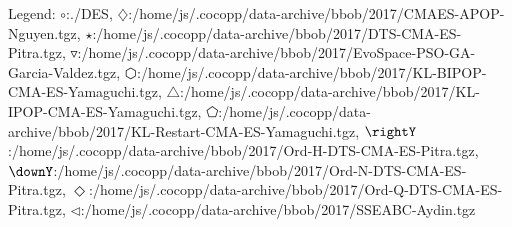 Legend: {\color{NavyBlue}$\circ$}:./DES, {\color{Magenta}$\diamondsuit$}:/home/js/.cocopp/data-archive/bbob/2017/CMAES-APOP-Nguyen.tgz, {\color{Orange}$\star$}:/home/js/.cocopp/data-archive/bbob/2017/DTS-CMA-ES-Pitra.tgz, {\color{CornflowerBlue}$\triangledown$}:/home/js/.cocopp/data-archive/bbob/2017/EvoSpace-PSO-GA-Garcia-Valdez.tgz, {\color{red}$\varhexagon$}:/home/js/.cocopp/data-archive/bbob/2017/KL-BIPOP-CMA-ES-Yamaguchi.tgz, {\color{YellowGreen}$\triangle$}:/home/js/.cocopp/data-archive/bbob/2017/KL-IPOP-CMA-ES-Yamaguchi.tgz, {\color{cyan}$\pentagon$}:/home/js/.cocopp/data-archive/bbob/2017/KL-Restart-CMA-ES-Yamaguchi.tgz, {\color{GreenYellow}$\rightY$}:/home/js/.cocopp/data-archive/bbob/2017/Ord-H-DTS-CMA-ES-Pitra.tgz, {\color{ForestGreen}$\downY$}:/home/js/.cocopp/data-archive/bbob/2017/Ord-N-DTS-CMA-ES-Pitra.tgz, {\color{Lavender}$\Diamond$}:/home/js/.cocopp/data-archive/bbob/2017/Ord-Q-DTS-CMA-ES-Pitra.tgz, {\color{SkyBlue}$\triangleleft$}:/home/js/.cocopp/data-archive/bbob/2017/SSEABC-Aydin.tgz